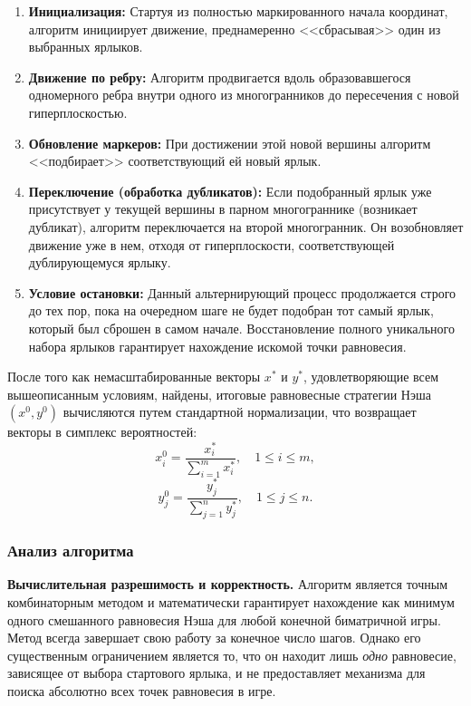 \begin{enumerate}
    \item \textbf{Инициализация:} Стартуя из полностью маркированного начала координат, алгоритм инициирует движение, преднамеренно <<сбрасывая>> один из выбранных ярлыков.
    \item \textbf{Движение по ребру:} Алгоритм продвигается вдоль образовавшегося одномерного ребра внутри одного из многогранников до пересечения с новой гиперплоскостью.
    \item \textbf{Обновление маркеров:} При достижении этой новой вершины алгоритм <<подбирает>> соответствующий ей новый ярлык.
    \item \textbf{Переключение (обработка дубликатов):} Если подобранный ярлык уже присутствует у текущей вершины в парном многограннике (возникает дубликат), алгоритм переключается на второй многогранник. Он возобновляет движение уже в нем, отходя от гиперплоскости, соответствующей дублирующемуся ярлыку.
    \item \textbf{Условие остановки:} Данный альтернирующий процесс продолжается строго до тех пор, пока на очередном шаге не будет подобран тот самый ярлык, который был сброшен в самом начале. Восстановление полного уникального набора ярлыков гарантирует нахождение искомой точки равновесия.
\end{enumerate}

После того как немасштабированные векторы $x^*$ и $y^*$, удовлетворяющие всем вышеописанным условиям, найдены, итоговые равновесные стратегии Нэша $(x^0, y^0)$ вычисляются путем стандартной нормализации, что возвращает векторы в симплекс вероятностей:
\begin{equation}
x_i^0 = \frac{x_i^*}{\sum_{i=1}^m x_i^*}, \quad 1 \leqslant i \leqslant m,
\end{equation}
\begin{equation}
y_j^0 = \frac{y_j^*}{\sum_{j=1}^n y_j^*}, \quad 1 \leqslant j \leqslant n.
\end{equation}

\subsubsection{Анализ алгоритма}

\textbf{Вычислительная разрешимость и корректность.} Алгоритм является точным комбинаторным методом и математически гарантирует нахождение как минимум одного смешанного равновесия Нэша для любой конечной биматричной игры. Метод всегда завершает свою работу за конечное число шагов. Однако его существенным ограничением является то, что он находит лишь \textit{одно} равновесие, зависящее от выбора стартового ярлыка, и не предоставляет механизма для поиска абсолютно всех точек равновесия в игре.

